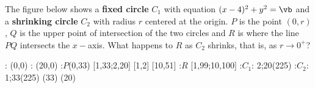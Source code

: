 
\SQUARE\va\vb
\MULTIPLY{}\vc
\MULTIPLY{}\vd
\MULTIPLY{}\ve

\question[4] The figure below shows a \textbf{fixed circle} $C_1$ with equation $(x-\va)^2 + y^2 = \vb$ and a
\textbf{shrinking circle} $C_2$ with radius $r$ centered at the origin. $P$ is the point $(0,r)$, $Q$ is 
the upper point of intersection of the two circles and $R$ is where the line $PQ$ intersects the $x-$axis. What 
happens to $R$ as $C_2$ shrinks, that is, as $r\to 0^+$?

\watchout[-45pt]

  \def\radA{33} %
  \def\radB{20} %
  : (0,0) 
  : (\radB,0)
  :$P$(0,\radA)
   [1,\radA;2,\radB]
   [1,2]
   [10,51]
  :$R$ [1,99;10,100]
   :$C_1$: 2;\radB (225)
   :$C_2$: 1;\radA (225)
\figdrawbegin{}
  (\radA)
  (\radB)
  \figdrawline [10,60]
\figdrawend
{}

\vspace{1cm}
\centerline{\box\figBoxA}

